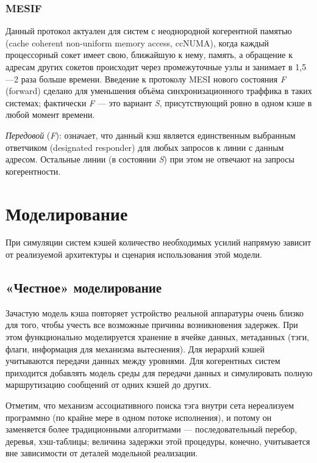 \subsubsection{MESIF}

Данный протокол актуален для систем с неоднородной когерентной памятью (\abbr cache coherent non-uniform memory access, ccNUMA), когда каждый процессорный сокет имеет свою, ближайшую к нему, память, а обращение к адресам других сокетов происходит через промежуточные узлы и занимает в 1,5---2 раза больше времени. Введение к протоколу MESI нового состояния \textit{F} (\abbr forward) сделано для уменьшения объёма синхронизационного траффика в таких системах; фактически \textit{F} --- это вариант \textit{S}, присутствующий ровно в одном кэше в любой момент времени.
\begin{itemize*}
\item \textit{Передовой} (\textit{F}): означает, что данный кэш является единственным выбранным ответчиком (\abbr designated responder) для любых запросов к линии с данным адресом. Остальные линии (в состоянии \textit{S}) при этом не отвечают на запросы когерентности. 
\end{itemize*}

\section{Моделирование}

При симуляции систем кэшей количество необходимых усилий напрямую зависит от реализуемой архитектуры и сценария использования этой модели.

\subsection{«Честное» моделирование}

Зачастую модель кэша повторяет устройство реальной аппаратуры очень близко для того, чтобы учесть все возможные причины возникновения задержек. При этом функционально моделируется хранение в ячейке данных, метаданных (тэги, флаги, информация для механизма вытеснения). Для иерархий кэшей учитываются передачи данных между уровнями. Для когерентных систем приходится добавлять модель среды для передачи данных и симулировать полную маршрутизацию сообщений от одних кэшей до других.

Отметим, что механизм ассоциативного поиска тэга внутри сета нереализуем программно (по крайне мере в одном потоке исполнения), и потому он заменяется более традиционными алгоритмами --- последовательный перебор, деревья, хэш-таблицы; величина задержки этой процедуры, конечно, учитывается вне зависимости от деталей модельной реализации.

